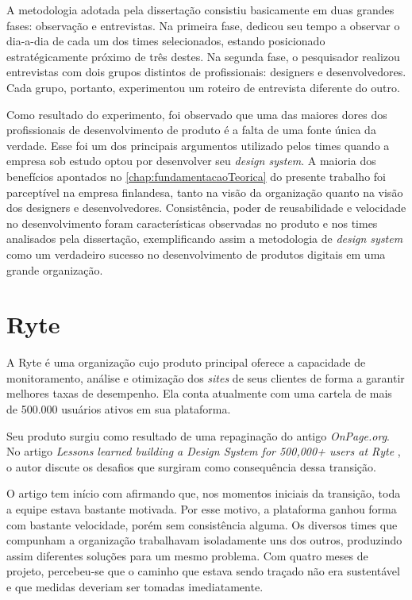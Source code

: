 A metodologia adotada pela dissertação consistiu basicamente em duas grandes fases: observação e entrevistas. Na primeira fase,  dedicou seu tempo a observar o dia-a-dia de cada um dos times selecionados, estando posicionado estratégicamente próximo de três destes. Na segunda fase, o pesquisador realizou entrevistas com dois grupos distintos de profissionais: designers e desenvolvedores. Cada grupo, portanto, experimentou um roteiro de entrevista diferente do outro.

Como resultado do experimento, foi observado que uma das maiores dores dos profissionais de desenvolvimento de produto é a falta de uma fonte única da verdade. Esse foi um dos principais argumentos utilizado pelos times quando a empresa sob estudo optou por desenvolver seu \textit{design system}. A maioria dos benefícios apontados no \autoref{chap:fundamentacaoTeorica} do presente trabalho foi parceptível na empresa finlandesa, tanto na visão da organização quanto na visão dos designers e desenvolvedores. Consistência, poder de reusabilidade e velocidade no desenvolvimento foram características observadas no produto e nos times analisados pela dissertação, exemplificando assim a metodologia de \textit{design system} como um verdadeiro sucesso no desenvolvimento de produtos digitais em uma grande organização.

\section{Ryte}
\label{sec:ryte}

A Ryte é uma organização cujo produto principal oferece a capacidade de monitoramento, análise e otimização dos \textit{sites} de seus clientes de forma a garantir melhores taxas de desempenho. Ela conta atualmente com uma cartela de mais de 500.000 usuários ativos em sua plataforma.

Seu produto surgiu como resultado de uma repaginação do antigo \textit{OnPage.org}. No artigo \textit{Lessons learned building a Design System for 500,000+ users at Ryte} \cite{ryteDesignSystem}, o autor discute os desafios que surgiram como consequência dessa transição.

O artigo tem início com  afirmando que, nos momentos iniciais da transição, toda a equipe estava bastante motivada. Por esse motivo, a plataforma ganhou forma com bastante velocidade, porém sem consistência alguma. Os diversos times que compunham a organização trabalhavam isoladamente uns dos outros, produzindo assim diferentes soluções para um mesmo problema. Com quatro meses de projeto, percebeu-se que o caminho que estava sendo traçado não era sustentável e que medidas deveriam ser tomadas imediatamente.

